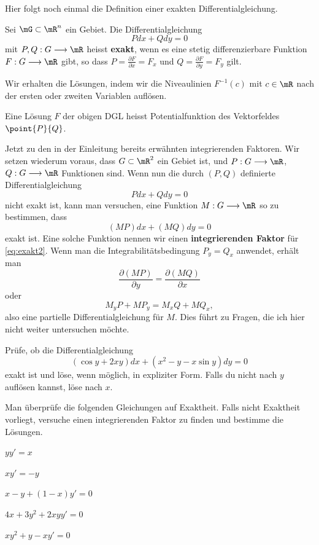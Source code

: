 \documentclass[%
draft,
11pt,%
twoside,%
titlepage,%
german,%
headsepline%
]{scrartcl}
\begin{document}
Hier folgt noch einmal die Definition einer exakten Differentialgleichung.
\begin{defn}
Sei
$\mG\subset\mR^n$ ein Gebiet. Die Differentialgleichung
$$Pdx+Qdy=0$$
mit $P,Q:G\longrightarrow\mR$ heisst \textbf{exakt}, wenn es eine stetig differenzierbare Funktion $F:G\longrightarrow\mR$ gibt, so dass $P=\frac{\partial F}{\partial x}=F_x$ und $Q=\frac{\partial F}{\partial y}=F_y$ gilt.
\end{defn}
\noindent Wir erhalten die L\"osungen, indem wir die Niveaulinien $F^{-1}(c)$ mit $c\in\mR$ nach der ersten oder zweiten Variablen aufl\"osen.

\begin{bem}
Eine L\"osung $F$ der obigen DGL heisst Potentialfunktion des Vektorfeldes $\point{P}{Q}$.
\end{bem}

Jetzt zu den in der Einleitung bereits erw\"ahnten integrierenden Faktoren. Wir setzen wiederum voraus, dass $G\subset\mR^2$ ein Gebiet ist, und $P:G\longrightarrow\mR$, $Q:G\longrightarrow\mR$ Funktionen sind. Wenn nun die durch $(P,Q)$ definierte Differentialgleichung
\begin{equation}\label{eq:exakt2}
Pdx+Qdy=0
\end{equation}
nicht exakt ist, kann man versuchen, eine Funktion $M:G\longrightarrow\mR$ so zu bestimmen, dass
$$(MP)dx+(MQ)dy=0$$
exakt ist. Eine solche Funktion nennen wir einen \textbf{integrierenden Faktor} f\"ur \eqref{eq:exakt2}. Wenn man die Integrabilit\"atsbedingung $P_y=Q_x$ anwendet, erh\"alt man
$$\frac{\partial(MP)}{\partial y}=\frac{\partial(MQ)}{\partial x}$$
oder
$$M_yP+MP_y=M_xQ+MQ_x,$$
also eine partielle Differentialgleichung f\"ur $M$. Dies f\"uhrt zu Fragen, die ich hier nicht weiter untersuchen m\"ochte.

\begin{ueb}
Pr\"ufe, ob die Differentialgleichung
$$(\cos y+2xy)dx+(x^2-y-x\sin y)dy=0$$
exakt ist und l\"ose, wenn m\"oglich, in expliziter Form. Falls du nicht nach $y$ aufl\"osen kannst, l\"ose nach $x$.
\end{ueb}


\begin{ueb}
Man \"uberpr\"ufe die folgenden Gleichungen auf Exaktheit. Falls nicht Exaktheit vorliegt, versuche einen integrierenden Faktor zu finden und bestimme die L\"osungen.
\begin{enumeratea}
\item $yy'=x$
\item $xy'=-y$
\item $x-y+(1-x)y'=0$
\item $4x+3y^2+2xyy'=0$
\item $xy^2+y-xy'=0$
\end{enumeratea}
\end{ueb}
\end{document}
